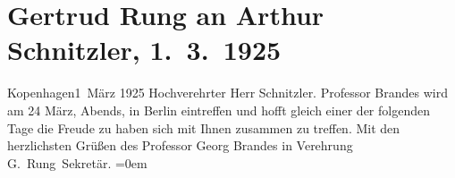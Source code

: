 

         
         \renewcommand{\erwaehntePersonen}{Personen: Georg Brandes}
         \renewcommand{\erwaehnteOrte}{Orte: Berlin, Kopenhagen, Wien}
         \renewcommand{\erwaehnteWerke}{}
               \section[Gertrud Rung an Arthur Schnitzler, 1. 3. 1925]{ Gertrud Rung an Arthur Schnitzler, 1. 3. 1925}\nopagebreak{}\rehead{ }\begin{ledgroupsized}[t]{13cm}\normalsize\beginnumbering \toendnotes[C]{\smallbreak\pagebreak[2]} 
\pstart
           \centering{}{\pb}Kopenhagen1 März 1925\pend
           \pstart{}Hochverehrter Herr Schnitzler.\pend\pstart
           Professor Brandes wird am 24
                        März, Abends, in Berlin
                    eintreffen und hofft gleich einer der folgenden Tage die Freude zu haben sich
                    mit Ihnen zusammen zu treffen.\pend
           \pstart
           Mit den herzlichsten Grüßen des Professor Georg Brandes in Verehrung{\\[\baselineskip]}\spacefill\mbox{G. Rung Sekretär.}\pend
           \leftskip=0em{}
         
         \endnumbering{}\end{ledgroupsized}  \newcommand{\dateiname}{L02435}\newcommand{\titel}{Gertrud Rung an Arthur Schnitzler, 1. 3. 1925}\newcommand{\editorInnen}{Martin Anton Müller und Gerd-Hermann Susen}
      
